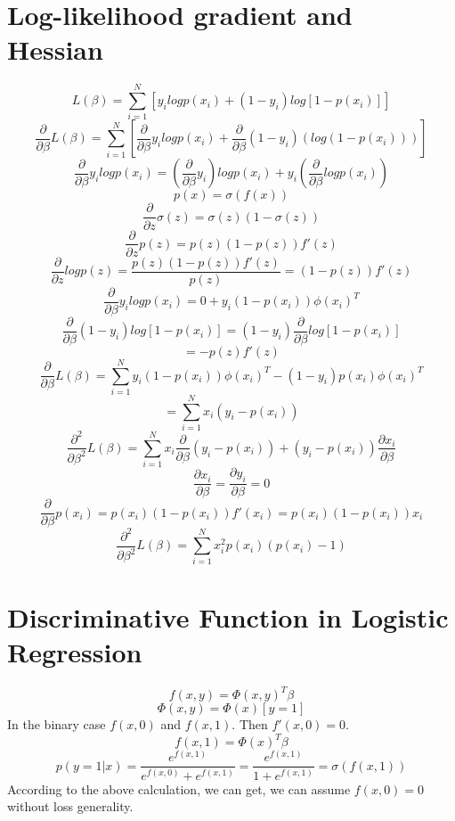 \documentclass{article}
\begin{document}
\section{Log-likelihood gradient and Hessian}
    \[L(\beta)=\sum_{i=1}^N[y_ilogp(x_i)+(1-y_i)log[1-p(x_i)]]\]
    \[\frac{\partial}{\partial\beta}L(\beta)=\sum_{i=1}^N[\frac{\partial}{\partial \beta}y_ilogp(x_i)+\frac{\partial}{\partial \beta}(1-y_i)(log(1-p(x_i)))]\]
    \[\frac{\partial}{\partial \beta}y_ilogp(x_i)=(\frac{\partial}{\partial\beta}y_i)logp(x_i)+y_i(\frac{\partial}{\partial\beta}logp(x_i))\]
    \[p(x)=\sigma(f(x))\]
    \[\frac{\partial}{\partial z}\sigma(z)=\sigma(z)(1-\sigma(z))\]
    \[\frac{\partial}{\partial z}p(z)=p(z)(1-p(z))f'(z)\]
    \[\frac{\partial}{\partial z}logp(z)=\frac{p(z)(1-p(z))f'(z)}{p(z)}=(1-p(z))f'(z)\]
    \[\frac{\partial}{\partial \beta}y_ilogp(x_i)=0+y_i(1-p(x_i))\phi(x_i)^T\]
    \[\frac{\partial}{\partial \beta}(1-y_i)log[1-p(x_i)]=(1-y_i)\frac{\partial}{\partial \beta}log[1-p(x_i)]\]
    \[=-p(z)f'(z)\]
    \[\frac{\partial}{\partial\beta}L(\beta)=\sum_{i=1}^Ny_i(1-p(x_i))\phi(x_i)^T-(1-y_i)p(x_i)\phi(x_i)^T\]
    \[=\sum_{i=1}^Nx_i(y_i-p(x_i))\]
    \[\frac{\partial^2}{\partial\beta^2}L(\beta)=\sum_{i=1}^Nx_i\frac{\partial}{\partial \beta}(y_i-p(x_i))+(y_i-p(x_i))\frac{\partial x_i}{\partial \beta}\]
    \[\frac{\partial x_i}{\partial \beta}=\frac{\partial y_i}{\partial \beta}=0\]
    \[\frac{\partial}{\partial \beta}p(x_i)=p(x_i)(1-p(x_i))f'(x_i)=p(x_i)(1-p(x_i))x_i\]
    \[\frac{\partial^2}{\partial\beta^2}L(\beta)=\sum_{i=1}^Nx_i^2p(x_i)(p(x_i)-1)\]
\newpage
\section{Discriminative Function in Logistic Regression}
\[f(x,y)=\Phi(x,y)^T\beta\]
\[\Phi(x,y)=\Phi(x)[y=1]\]
In the binary case $f(x,0)$ and $f(x,1)$. Then $f'(x,0)=0$.
\[f(x,1)=\Phi(x)^T\beta\]
\[p(y=1|x)=\frac{e^{f(x,1)}}{e^{f(x,0)}+e^{f(x,1)}}=\frac{e^{f(x,1)}}{1+e^{f(x,1)}}=\sigma(f(x,1))\]
According to the above calculation, we can get, we can assume $f(x,0)=0$ without loss generality.
\end{document}

